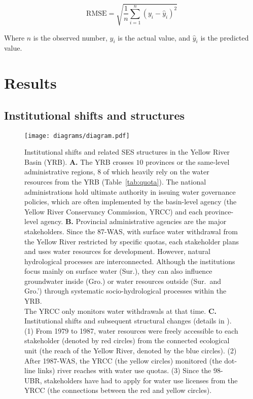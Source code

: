 \documentclass[preprint, 12pt]{elsarticle}
\begin{document}
\begin{equation}
    \label{ch5:eq:RMSE}
    \text{RMSE} = \sqrt{\frac{1}{n}\sum_{i=1}^{n}{(y_i-\hat{y}_i)}^2}
\end{equation}

Where $n$ is the observed number, $y_i$ is the actual value, and $\hat{y}_i$ is the predicted value.










\section{Results}\label{sec:results}


\subsection{Institutional shifts and structures}\label{results-1}

\begin{figure*}[!t]
	\texttt{[image: diagrams/diagram.pdf]}
	\caption{
Institutional shifts and related SES structures in the Yellow River Basin (YRB).
		\textbf{A.} The YRB crosses $10$ provinces or the same-level administrative regions, $8$ of which heavily rely on the water resources from the YRB (Table~\ref{tab:quota}). The national administrations hold ultimate authority in issuing water governance policies, which are often implemented by the basin-level agency (the Yellow River Conservancy Commission, YRCC) and each province-level agency.
		\textbf{B.} Provincial administrative agencies are the major stakeholders. Since the 87-WAS, with surface water withdrawal from the Yellow River restricted by specific quotas, each stakeholder plans and uses water resources for development. However, natural hydrological processes are interconnected. Although the institutions focus mainly on surface water (Sur.), they can also influence groundwater inside (Gro.) or water resources outside (Sur.\ and Gro.') through systematic socio-hydrological processes within the YRB.\\ The YRCC only monitors water withdrawals at that time.
		\textbf{C.} Institutional shifts and subsequent structural changes (details in \textit{}). (1) From 1979 to 1987, water resources were freely accessible to each stakeholder (denoted by red circles) from the connected ecological unit (the reach of the Yellow River, denoted by the blue circles). (2) After 1987-WAS, the YRCC (the yellow circles) monitored (the dot-line links) river reaches with water use quotas. (3) Since the 98-UBR, stakeholders have had to apply for water use licenses from the YRCC (the connections between the red and yellow circles).
	}\label{fig:structure}
\end{figure*}
\end{document}
